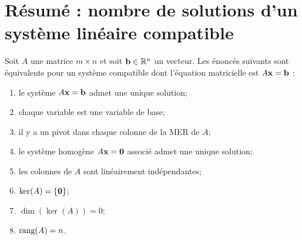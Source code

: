 \section{Résumé : nombre de solutions d'un système linéaire compatible}
\label{section:uniqesol}
\begin{theorem}\label{thm:uniqesol}
Soit $A$ une matrice $m\times n$ et soit $\mathbf{b}\in \mathbb{R}^n$ un vecteur.
Les \'enonc\'es suivants sont équivalents pour un système compatible dont l'équation matricielle est $A\mathbf{x}=\mathbf{b}$ : 
\begin{enumerate}[(1)]

\item le système $A\mathbf{x} = \mathbf{b}$ admet une unique solution; 
\item chaque variable est une variable de base; 
\item il y a un pivot dans chaque colonne de la MER de $A$; 

\item le système homogène $A\mathbf{x} = \mathbf{0}$ associé admet une unique solution; 
\item les colonnes de $A$ sont linéairement indépendantes; 
\item $\ker(A) = \{\mathbf{0}\}$; 
\item $\dim(\ker(A)) = 0$; 
\item $\textrm{rang}(A)= n$.
\end{enumerate}
\end{theorem}

